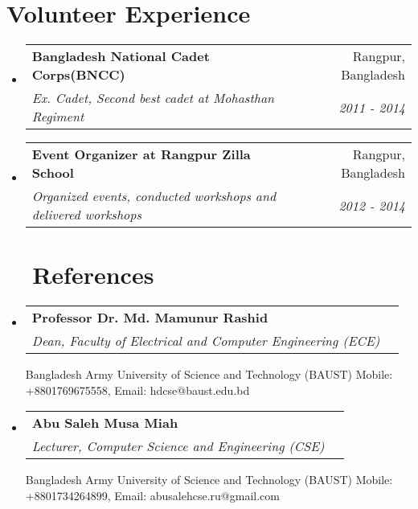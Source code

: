 \documentclass[a4paper,20pt]{article}
\makeatletter
\newcommand{\resumeSubheading}[4]{
  \vspace{-1pt}\item
    \begin{tabular*}{0.97\textwidth}{l@{\extracolsep{\fill}}r}
      \textbf{#1} & #2 \\
      \textit{#3} & \textit{#4} \\
    \end{tabular*}\vspace{-5pt}
}
\newcommand{\resumeSubHeadingListStart}{\begin{itemize}[leftmargin=*]}
\newcommand{\resumeSubHeadingListEnd}{\end{itemize}}
\makeatother
\begin{document}
\begin{comment}
\section{Honors and Awards}
\begin{description}[font=$\bullet$]
\item {Awarded title of Intel Software Innovator - May, 2019}
\vspace{10pt}
\item {Second Runner's Up at TCS EngiNx Engineering Project Innovation Content - September, 2018 }
\vspace{-5pt}
\item {Runner's Up at Facebook Developers Circle Hackathon - August, 2017}

\end{description}

\vspace{5pt}
\end{comment}

\section{Volunteer Experience}
  \resumeSubHeadingListStart
	\resumeSubheading
    {Bangladesh National Cadet Corps(BNCC)}{Rangpur, Bangladesh}
    {Ex. Cadet, Second best cadet at Mohasthan Regiment}{2011 - 2014}
\vspace{1pt}
    \resumeSubheading
    {Event Organizer at Rangpur Zilla School}{Rangpur, Bangladesh}
    {Organized events, conducted workshops and delivered workshops}{2012 - 2014}

\resumeSubHeadingListEnd

\vspace{5pt}

\section{~~References}
  \resumeSubHeadingListStart
    \resumeSubheading
      {Professor Dr. Md. Mamunur Rashid}{} 
      {Dean, Faculty of Electrical and Computer Engineering (ECE)}{} 
      \hfill \break
      {Bangladesh Army University of Science and Technology (BAUST)
      \newline
      Mobile: +8801769675558, Email: hdcse@baust.edu.bd \DontPrintColon}
  \resumeSubHeadingListEnd
  
  \resumeSubHeadingListStart
    \resumeSubheading
      {Abu Saleh Musa Miah}{} 
      {Lecturer, Computer Science and Engineering (CSE)}{} 
      \hfill \break
      {Bangladesh Army University of Science and Technology (BAUST)
      \newline
      Mobile: +8801734264899, Email: abusalehcse.ru@gmail.com \DontPrintColon}
  \resumeSubHeadingListEnd
\end{document}
